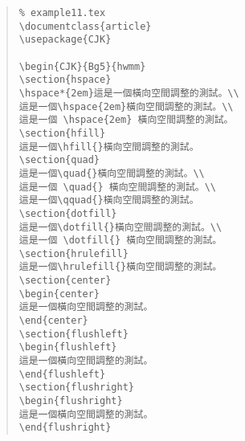 \begin{quote}
   \begin{verbatim}
% example11.tex
\documentclass{article}
\usepackage{CJK}

\begin{CJK}{Bg5}{hwmm}
\section{hspace}
\hspace*{2em}這是一個橫向空間調整的測試。\\
這是一個\hspace{2em}橫向空間調整的測試。\\
這是一個 \hspace{2em} 橫向空間調整的測試。
\section{hfill}
這是一個\hfill{}橫向空間調整的測試。
\section{quad}
這是一個\quad{}橫向空間調整的測試。\\
這是一個 \quad{} 橫向空間調整的測試。\\
這是一個\qquad{}橫向空間調整的測試。
\section{dotfill}
這是一個\dotfill{}橫向空間調整的測試。\\
這是一個 \dotfill{} 橫向空間調整的測試。
\section{hrulefill}
這是一個\hrulefill{}橫向空間調整的測試。
\section{center}
\begin{center}
這是一個橫向空間調整的測試。
\end{center}
\section{flushleft}
\begin{flushleft}
這是一個橫向空間調整的測試。
\end{flushleft}
\section{flushright}
\begin{flushright}
這是一個橫向空間調整的測試。
\end{flushright}

\end{verbatim}
\end{quote}
